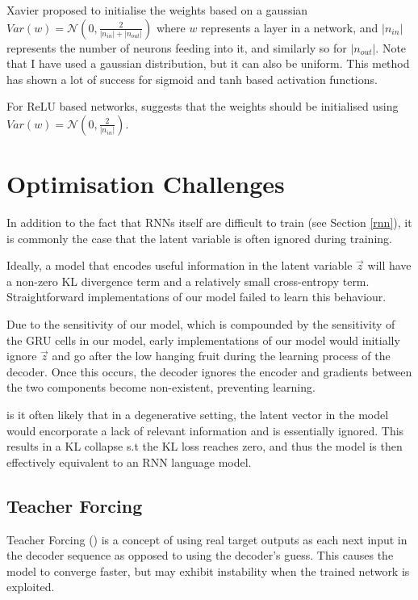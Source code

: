 \documentclass[12pt,twoside]{report}
\begin{document}

Xavier 
proposed to initialise the weights based on a gaussian $Var(w)=\mathcal{N}(0,\frac{2}{|n_{in}| + |n_{out}| })$ where $w$ represents a layer in a network, and $|n_{in}|$ represents the number of neurons feeding into it, and similarly so for $|n_{out}|$. Note that I have used a gaussian distribution, but it can also be uniform. This method has shown a lot of success for sigmoid and tanh based activation functions.

For ReLU based networks, 
suggests that the weights should be initialised using $Var(w)=\mathcal{N}(0,\frac{2}{|n_{in}|})$. 

\section{Optimisation Challenges}
\label{optimisation_challenges}

In addition to the fact that RNNs itself are difficult to train (see Section \ref{rnn}), it is commonly the case that the latent variable is often ignored during training.

Ideally, a model that encodes useful information in the latent variable $\overrightarrow{z}$ will have a non-zero KL divergence term and a relatively small cross-entropy term. Straightforward implementations of our model failed to learn this behaviour.

Due to the sensitivity of our model, which is compounded by the sensitivity of the GRU cells in our model, early implementations of our model would initially ignore $\overrightarrow{z}$ and go after the low hanging fruit during the learning process of the decoder. Once this occurs, the decoder ignores the encoder and gradients between the two components become non-existent, preventing learning.

is it often likely that in a degenerative setting, the latent vector in the model would encorporate a lack of relevant information and is essentially ignored. This results in a KL collapse s.t the KL loss reaches zero, and thus the model is then effectively equivalent to an RNN language model.

\subsection{Teacher Forcing}

Teacher Forcing (\cite{williams_learning_1989}) is a concept of using real target outputs as each next input in the decoder sequence as opposed to using the decoder's guess. This causes the model to converge faster, but may exhibit instability when the trained network is exploited.
\end{document}
